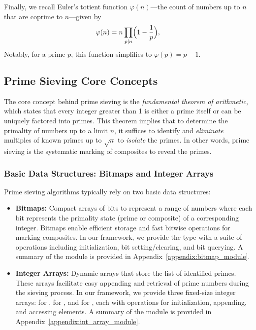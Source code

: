 \documentclass{article}
\begin{document}
\noindent
Finally, we recall Euler’s totient function $\varphi(n)$—the count of numbers up to $n$ that are coprime to $n$—given by
\begin{equation}
    \varphi(n) = n \prod_{p \mid n} \Bigl( 1 - \frac{1}{p} \Bigr),
\end{equation}
Notably, for a prime $p$, this function simplifies to $\varphi(p) = p - 1$.

\subsection{Prime Sieving Core Concepts}

The core concept behind prime sieving is the \emph{fundamental theorem of arithmetic}, which states that every integer greater than 1 is either a prime itself or can be uniquely factored into primes. This theorem implies that to determine the primality of numbers up to a limit $n$, it suffices to identify and \textit{eliminate} multiples of known primes up to $\sqrt{n}$ to \textit{isolate} the primes.
In other words, prime sieving is the systematic marking of composites to reveal the primes.

\subsubsection{Basic Data Structures: Bitmaps and Integer Arrays}

Prime sieving algorithms typically rely on two basic data structures:

\begin{itemize}
    \item \textbf{Bitmaps:} Compact arrays of bits to represent a range of numbers where each bit represents the primality state (prime or composite) of a corresponding integer. Bitmaps enable efficient storage and fast bitwise operations for marking composites.
    In our framework, we provide the  type with a suite of operations including initialization, bit setting/clearing, and bit querying. A summary of the  module is provided in Appendix~\ref{appendix:bitmap_module}.
    \item \textbf{Integer Arrays:} Dynamic arrays that store the list of identified primes. These arrays facilitate easy appending and retrieval of prime numbers during the sieving process.
    In our framework, we provide three fixed-size integer arrays:  for ,  for , and  for , each with operations for initialization, appending, and accessing elements. A summary of the  module is provided in Appendix~\ref{appendix:int_array_module}.
\end{itemize}
\end{document}
